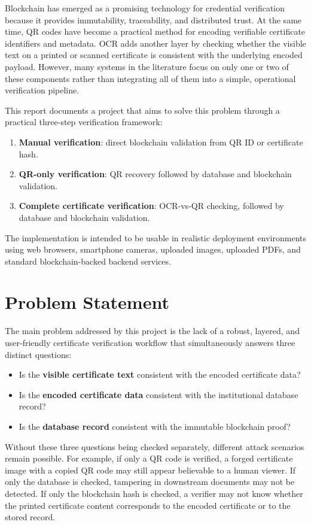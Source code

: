 \documentclass[12pt,a4paper]{article}
\begin{document}
Blockchain has emerged as a promising technology for credential verification because it provides immutability, traceability, and distributed trust. At the same time, QR codes have become a practical method for encoding verifiable certificate identifiers and metadata. OCR adds another layer by checking whether the visible text on a printed or scanned certificate is consistent with the underlying encoded payload. However, many systems in the literature focus on only one or two of these components rather than integrating all of them into a simple, operational verification pipeline.

This report documents a project that aims to solve this problem through a practical three-step verification framework:
\begin{enumerate}[leftmargin=1.5em]
\item \textbf{Manual verification}: direct blockchain validation from QR ID or certificate hash.
\item \textbf{QR-only verification}: QR recovery followed by database and blockchain validation.
\item \textbf{Complete certificate verification}: OCR-vs-QR checking, followed by database and blockchain validation.
\end{enumerate}

The implementation is intended to be usable in realistic deployment environments using web browsers, smartphone cameras, uploaded images, uploaded PDFs, and standard blockchain-backed backend services.

\section{Problem Statement}
The main problem addressed by this project is the lack of a robust, layered, and user-friendly certificate verification workflow that simultaneously answers three distinct questions:
\begin{itemize}[leftmargin=1.5em]
\item Is the \textbf{visible certificate text} consistent with the encoded certificate data?
\item Is the \textbf{encoded certificate data} consistent with the institutional database record?
\item Is the \textbf{database record} consistent with the immutable blockchain proof?
\end{itemize}

Without these three questions being checked separately, different attack scenarios remain possible. For example, if only a QR code is verified, a forged certificate image with a copied QR code may still appear believable to a human viewer. If only the database is checked, tampering in downstream documents may not be detected. If only the blockchain hash is checked, a verifier may not know whether the printed certificate content corresponds to the encoded certificate or to the stored record.
\end{document}
